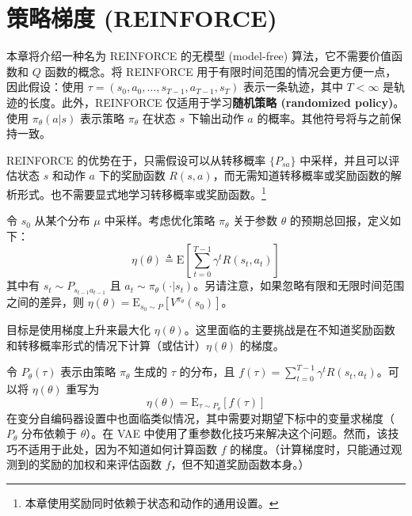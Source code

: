 \chapter{策略梯度 (REINFORCE)}

本章将介绍一种名为 REINFORCE 的无模型 (model-free) 算法，它不需要价值函数和 $Q$ 函数的概念。将 REINFORCE 用于有限时间范围的情况会更方便一点，因此假设：使用 $\tau = (s_0, a_0, \dots, s_{T-1}, a_{T-1}, s_T)$ 表示一条轨迹，其中 $T < \infty$ 是轨迹的长度。此外，REINFORCE 仅适用于学习\textbf{随机策略 (randomized policy)}。使用 $\pi_\theta(a|s)$ 表示策略 $\pi_\theta$ 在状态 $s$ 下输出动作 $a$ 的概率。其他符号将与之前保持一致。

REINFORCE 的优势在于，只需假设可以从转移概率 $\{P_{sa}\}$ 中采样，并且可以评估状态 $s$ 和动作 $a$ 下的奖励函数 $R(s, a)$，而无需知道转移概率或奖励函数的解析形式。也不需要显式地学习转移概率或奖励函数。\footnote{本章使用奖励同时依赖于状态和动作的通用设置。}

令 $s_0$ 从某个分布 $\mu$ 中采样。考虑优化策略 $\pi_\theta$ 关于参数 $\theta$ 的预期总回报，定义如下：
\begin{equation} \label{eq:17.1}
    \eta(\theta) \triangleq \mathrm{E} \left[ \sum_{t=0}^{T-1} \gamma^t R(s_t, a_t) \right]
\end{equation}
其中有 $s_t \sim P_{s_{t-1}a_{t-1}}$ 且 $a_t \sim \pi_\theta(\cdot|s_t)$。另请注意，如果忽略有限和无限时间范围之间的差异，则 $\eta(\theta) = \mathrm{E}_{s_0 \sim P} [V^{\pi_\theta}(s_0)]$。

目标是使用梯度上升来最大化 $\eta(\theta)$。这里面临的主要挑战是在不知道奖励函数和转移概率形式的情况下计算（或估计）$\eta(\theta)$ 的梯度。

令 $P_\theta(\tau)$ 表示由策略 $\pi_\theta$ 生成的 $\tau$ 的分布，且 $f(\tau) = \sum_{t=0}^{T-1} \gamma^t R(s_t, a_t)$。可以将 $\eta(\theta)$ 重写为
\begin{equation} \label{eq:17.2}
    \eta(\theta) = \mathrm{E}_{\tau \sim P_\theta} [f(\tau)]
\end{equation}
在变分自编码器设置中也面临类似情况，其中需要对期望下标中的变量求梯度（$P_\theta$ 分布依赖于 $\theta$）。在 VAE 中使用了重参数化技巧来解决这个问题。然而，该技巧不适用于此处，因为不知道如何计算函数 $f$ 的梯度。（计算梯度时，只能通过观测到的奖励的加权和来评估函数 $f$，但不知道奖励函数本身。）

